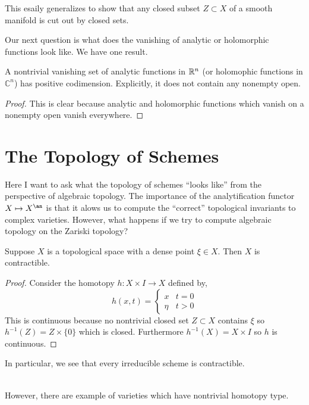 \documentclass[12pt]{article}
\begin{document}
\begin{rmk}
This esaily generalizes to show that any closed subset $Z \subset X$ of a smooth manifold is cut out by closed sets.
\end{rmk}
\noindent
Our next question is what does the vanishing of analytic or holomorphic functions look like. We have one result.

\begin{prop}
A nontrivial vanishing set of analytic functions in $\mathbb{R}^n$ (or holomophic functions in $\mathbb{C}^n$) has positive codimension. Explicitly, it does not contain any nonempty open. 
\end{prop}

\begin{proof}
This is clear because analytic and holomorphic functions which vanish on a nonempty open vanish everywhere. 
\end{proof}

\section{The Topology of Schemes}

Here I want to ask what the topology of schemes ``looks like'' from the perspective of algebraic topology. The importance of the analytification functor $X \mapsto X^\an$ is that it alows us to compute the ``correct'' topological invariants to complex varieties. However, what happens if we try to compute algebraic topology on the Zariski topology?

\begin{lemma}
Suppose $X$ is a topological space with a dense point $\xi \in X$. Then $X$ is contractible.
\end{lemma}

\begin{proof}
Consider the homotopy $h : X \times I \to X$ defined by,
\[ h(x, t) = 
\begin{cases}
x & t = 0
\\
\eta & t > 0
\end{cases} \]
This is continuous because no nontrivial closed set $Z \subset X$ contains $\xi$ so $h^{-1}(Z) = Z \times \{ 0 \}$ which is closed. Furthermore $h^{-1}(X) = X \times I$ so $h$ is continuous. 
\end{proof}

\begin{rmk}
In particular, we see that every irreducible scheme is contractible. 
\end{rmk}
\noindent\\
However, there are example of varieties which have nontrivial homotopy type. 
\end{document}

